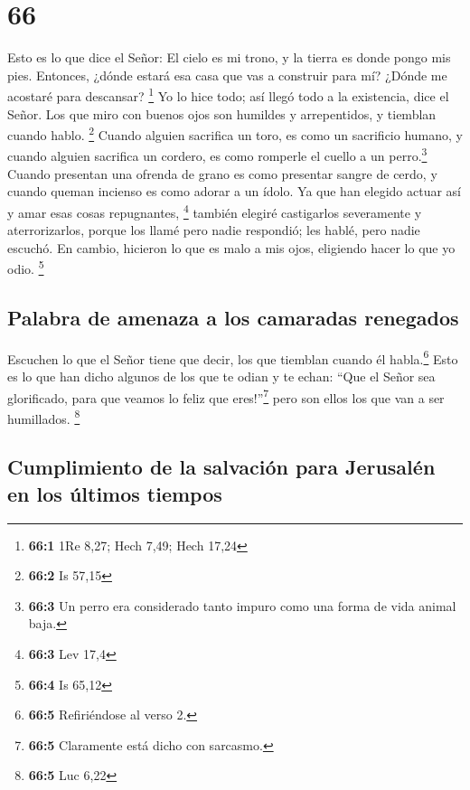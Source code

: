 \hypertarget{section-65}{%
\section{66}\label{section-65}}

 Esto es lo que dice el Señor: El cielo es mi trono, y la
tierra es donde pongo mis pies. Entonces, ¿dónde estará esa casa que vas
a construir para mí? ¿Dónde me acostaré para descansar? \footnote{\textbf{66:1}
  1Re 8,27; Hech 7,49; Hech 17,24}  Yo lo hice todo; así
llegó todo a la existencia, dice el Señor. Los que miro con buenos ojos
son humildes y arrepentidos, y tiemblan cuando hablo. \footnote{\textbf{66:2}
  Is 57,15}  Cuando alguien sacrifica un toro, es como un
sacrificio humano, y cuando alguien sacrifica un cordero, es como
romperle el cuello a un perro.\footnote{\textbf{66:3} Un perro era
  considerado tanto impuro como una forma de vida animal baja.} Cuando
presentan una ofrenda de grano es como presentar sangre de cerdo, y
cuando queman incienso es como adorar a un ídolo. Ya que han elegido
actuar así y amar esas cosas repugnantes, \footnote{\textbf{66:3} Lev
  17,4}  también elegiré castigarlos severamente y
aterrorizarlos, porque los llamé pero nadie respondió; les hablé, pero
nadie escuchó. En cambio, hicieron lo que es malo a mis ojos, eligiendo
hacer lo que yo odio. \footnote{\textbf{66:4} Is 65,12}

\hypertarget{palabra-de-amenaza-a-los-camaradas-renegados}{%
\subsection{Palabra de amenaza a los camaradas
renegados}\label{palabra-de-amenaza-a-los-camaradas-renegados}}

 Escuchen lo que el Señor tiene que decir, los que
tiemblan cuando él habla.\footnote{\textbf{66:5} Refiriéndose al verso
  2.} Esto es lo que han dicho algunos de los que te odian y te echan:
``Que el Señor sea glorificado, para que veamos lo feliz que
eres!''\footnote{\textbf{66:5} Claramente está dicho con sarcasmo.} pero
son ellos los que van a ser humillados. \footnote{\textbf{66:5} Luc 6,22}

\hypertarget{cumplimiento-de-la-salvaciuxf3n-para-jerusaluxe9n-en-los-uxfaltimos-tiempos}{%
\subsection{Cumplimiento de la salvación para Jerusalén en los últimos
tiempos}\label{cumplimiento-de-la-salvaciuxf3n-para-jerusaluxe9n-en-los-uxfaltimos-tiempos}}

